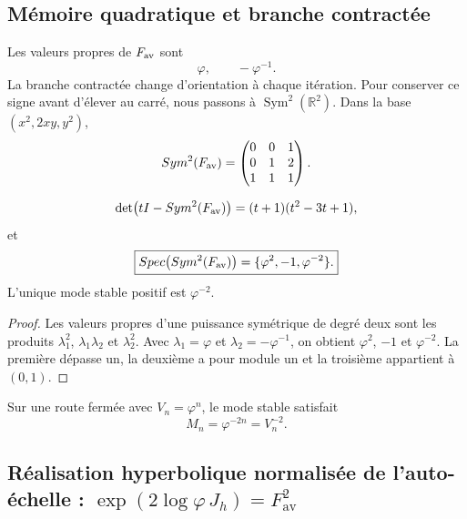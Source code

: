 \subsection{Mémoire quadratique et branche contractée}

Les valeurs propres de \(F_{\rm av}\) sont
\[
 \varphi,
 \qquad
 -\varphi^{-1}.
\]
La branche contractée change d’orientation à chaque itération. Pour conserver
ce signe avant d’élever au carré, nous passons à
\(\operatorname{Sym}^2(\mathbb R^2)\). Dans la base
\((x^2,2xy,y^2)\),
\begin{equation}
 \operatorname{Sym}^2(F_{\rm av})=
 \begin{pmatrix}
 0&0&1\\
 0&1&2\\
 1&1&1
 \end{pmatrix}.
 \label{p12-83-c9-s3:eq:sym2-Fav-phi}
\end{equation}

\begin{theorem}
\label{p12-83-c9-s3:thm:espectro-sym2-phi}
\[
 \det\bigl(tI-\operatorname{Sym}^2(F_{\rm av})\bigr)
 =(t+1)(t^2-3t+1),
\]
et
\begin{equation}
 \boxed{
 \operatorname{Spec}\bigl(\operatorname{Sym}^2(F_{\rm av})\bigr)
 =\{\varphi^2,-1,\varphi^{-2}\}.}
 \label{p12-83-c9-s3:eq:espectro-sym2-phi}
\end{equation}
L’unique mode stable positif est \(\varphi^{-2}\).
\end{theorem}

\begin{proof}
Les valeurs propres d’une puissance symétrique de degré deux sont les produits
\(\lambda_1^2\), \(\lambda_1\lambda_2\) et \(\lambda_2^2\). Avec
\(\lambda_1=\varphi\) et \(\lambda_2=-\varphi^{-1}\), on obtient
\(\varphi^2\), \(-1\) et \(\varphi^{-2}\). La première dépasse un, la
deuxième a pour module un et la troisième appartient à \((0,1)\).
\end{proof}

Sur une route fermée avec \(V_n=\varphi^n\), le mode stable satisfait
\begin{equation}
 \boxed{M_n=\varphi^{-2n}=V_n^{-2}.}
 \label{p12-83-c9-s3:eq:modo-estable-phi}
\end{equation}

\subsection{Réalisation hyperbolique normalisée de l’auto-échelle : \(\exp(2\log\varphi\,J_h)=F_{\mathrm{av}}^2\)}

